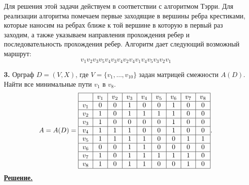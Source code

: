 \documentclass[12pt, letterpaper, titlepage]{article}
\begin{document}
Для решения этой задачи действуем в соответствии с алгоритмом Тэрри.
Для реализации алгоритма помечаем первые заходящие в вершины ребра крестиками, которые наносим на 
ребрах ближе к той вершине в которую в первый
раз заходим, а также указываем направления прохождения ребер и последовательность
прохождения ребер. Алгоритм дает следующий возможный маршрут:
\begin{equation*}
    v_1v_2v_3v_5v_4v_3v_4v_2v_4v_1v_4v_5v_3v_2v_1
\end{equation*}
\begin{center}\end{center}
\iffalse
\textbf{3.} Используя алгоритм “фронта волны”, найти все минимальные пути из первой вершины в
последнюю орграфа, заданного матрицей смежности
\begin{equation*}
    A =
    \begin{pmatrix}
        0 & 0 & 1 & 0 & 0 & 1 & 0 & 0\\
        1 & 0 & 1 & 1 & 1 & 1 & 0 & 0\\
        1 & 0 & 0 & 0 & 0 & 1 & 0 & 0\\
        1 & 1 & 1 & 0 & 0 & 1 & 0 & 0\\
        1 & 1 & 1 & 1 & 0 & 0 & 1 & 1\\
        0 & 0 & 1 & 1 & 0 & 0 & 0 & 0\\
        1 & 0 & 1 & 1 & 1 & 1 & 1 & 0\\
        1 & 0 & 1 & 1 & 0 & 0 & 1 & 0\\        
    \end{pmatrix}.
\end{equation*}
\fi
\textbf{3.} Орграф $D=(V,X)$, где $V = \{v_1, \dots, v_{10}\}$ задан матрицей
смежности $A(D)$. Найти все минимальные пути $v_1$ в $v_{8}$.
\begin{equation*}
    A = A(D) =
    \begin{tabular}{ | c | c | c | c | c | c | c | c | c |}
        \hline
        & $v_1$ & $v_2$ & $v_3$ & $v_4$ & $v_5$ & $v_6$ & $v_7$ & $v_8$\\
        \hline
        $v_1$& 0 & 0 & 1 & 0 & 0 & 1 & 0 & 0\\
        \hline
        $v_2$& 1 & 0 & 1 & 1 & 1 & 1 & 0 & 0\\
        \hline
        $v_3$& 1 & 0 & 0 & 0 & 0 & 1 & 0 & 0\\
        \hline
        $v_4$& 1 & 1 & 1 & 0 & 0 & 1 & 0 & 0\\
        \hline
        $v_5$& 1 & 1 & 1 & 1 & 0 & 0 & 1 & 1\\
        \hline
        $v_6$& 0 & 0 & 1 & 1 & 0 & 0 & 0 & 0\\
        \hline
        $v_7$& 1 & 0 & 1 & 1 & 1 & 1 & 1 & 0\\
        \hline
        $v_8$& 1 & 0 & 1 & 1 & 0 & 0 & 1 & 0\\
        \hline
    \end{tabular}.
\end{equation*}
\underline{\textbf{Решение.}}
\end{document}
